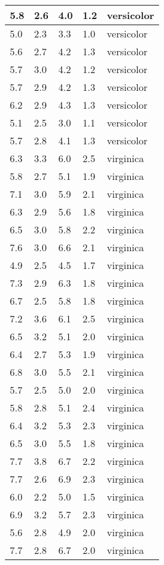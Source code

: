 \begin{table}
\begin{tabular}{|l|l|l|l|l|}
5.8 & 2.6 & 4.0 & 1.2 & versicolor \\ \hline
5.0 & 2.3 & 3.3 & 1.0 & versicolor \\ \hline
5.6 & 2.7 & 4.2 & 1.3 & versicolor \\ \hline
5.7 & 3.0 & 4.2 & 1.2 & versicolor \\ \hline
5.7 & 2.9 & 4.2 & 1.3 & versicolor \\ \hline
6.2 & 2.9 & 4.3 & 1.3 & versicolor \\ \hline
5.1 & 2.5 & 3.0 & 1.1 & versicolor \\ \hline
5.7 & 2.8 & 4.1 & 1.3 & versicolor \\ \hline
6.3 & 3.3 & 6.0 & 2.5 & virginica \\ \hline
5.8 & 2.7 & 5.1 & 1.9 & virginica \\ \hline
7.1 & 3.0 & 5.9 & 2.1 & virginica \\ \hline
6.3 & 2.9 & 5.6 & 1.8 & virginica \\ \hline
6.5 & 3.0 & 5.8 & 2.2 & virginica \\ \hline
7.6 & 3.0 & 6.6 & 2.1 & virginica \\ \hline
4.9 & 2.5 & 4.5 & 1.7 & virginica \\ \hline
7.3 & 2.9 & 6.3 & 1.8 & virginica \\ \hline
6.7 & 2.5 & 5.8 & 1.8 & virginica \\ \hline
7.2 & 3.6 & 6.1 & 2.5 & virginica \\ \hline
6.5 & 3.2 & 5.1 & 2.0 & virginica \\ \hline
6.4 & 2.7 & 5.3 & 1.9 & virginica \\ \hline
6.8 & 3.0 & 5.5 & 2.1 & virginica \\ \hline
5.7 & 2.5 & 5.0 & 2.0 & virginica \\ \hline
5.8 & 2.8 & 5.1 & 2.4 & virginica \\ \hline
6.4 & 3.2 & 5.3 & 2.3 & virginica \\ \hline
6.5 & 3.0 & 5.5 & 1.8 & virginica \\ \hline
7.7 & 3.8 & 6.7 & 2.2 & virginica \\ \hline
7.7 & 2.6 & 6.9 & 2.3 & virginica \\ \hline
6.0 & 2.2 & 5.0 & 1.5 & virginica \\ \hline
6.9 & 3.2 & 5.7 & 2.3 & virginica \\ \hline
5.6 & 2.8 & 4.9 & 2.0 & virginica \\ \hline
7.7 & 2.8 & 6.7 & 2.0 & virginica \\ \hline

\end{tabular}
\end{table}
